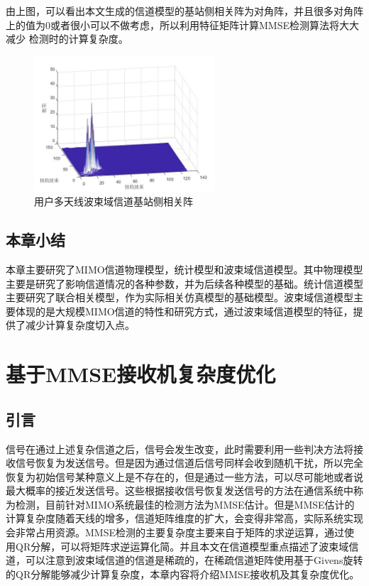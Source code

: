 \documentclass[bachelor,nocolorlinks, printoneside]{seuthesis} %
\begin{document}
\begin{Main}
由上图，可以看出本文生成的信道模型的基站侧相关阵为对角阵，并且很多对角阵上的值为0或者很小可以不做考虑，所以利用特征矩阵计算MMSE检测算法将大大减少
检测时的计算复杂度。

\begin{figure}[htbp!]
	\centering \includegraphics[width=0.6\textwidth]{img/2_4.jpg} \caption{用户多天线波束域信道基站侧相关阵}
\end{figure}


\section{本章小结}
本章主要研究了MIMO信道物理模型，统计模型和波束域信道模型。其中物理模型主要是研究了影响信道情况的各种参数，并为后续各种模型的基础。统计信道模型主要研究了联合相关模型，作为实际相关仿真模型的基础模型。波束域信道模型主要体现的是大规模MIMO信道的特性和研究方式，通过波束域信道模型的特征，提供了减少计算复杂度切入点。

\chapter{基于MMSE接收机复杂度优化}
\section{引言}
信号在通过上述复杂信道之后，信号会发生改变，此时需要利用一些判决方法将接收信号恢复为发送信号。但是因为通过信道后信号同样会收到随机干扰，所以完全恢复为初始信号某种意义上是不存在的，但是通过一些方法，可以尽可能地或者说最大概率的接近发送信号。这些根据接收信号恢复发送信号的方法在通信系统中称为检测，目前针对MIMO系统最佳的检测方法为MMSE估计。但是MMSE估计的计算复杂度随着天线的增多，信道矩阵维度的扩大，会变得非常高，实际系统实现会非常占用资源。MMSE检测的主要复杂度主要来自于矩阵的求逆运算，通过使用QR分解，可以将矩阵求逆运算化简。并且本文在信道模型重点描述了波束域信道，可以注意到波束域信道的信道是稀疏的，在稀疏信道矩阵使用基于Givens旋转的QR分解能够减少计算复杂度，本章内容将介绍MMSE接收机及其复杂度优化。

\end{Main}
\end{document}
